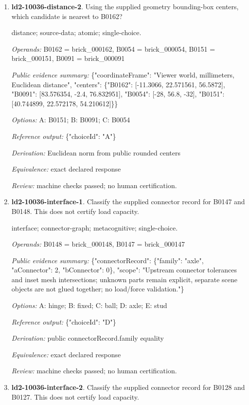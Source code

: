 \begin{enumerate}
\item \textbf{ld2-10036-distance-2}. Using the supplied geometry bounding-box centers, which candidate is nearest to B0162?
\par{\small distance; source-data; atomic; single-choice.\par\textit{Operands:} B0162 = brick\_000162, B0054 = brick\_000054, B0151 = brick\_000151, B0091 = brick\_000091\par\textit{Public evidence summary:} \{"coordinateFrame": "Viewer world, millimeters, Euclidean distance", "centers": \{"B0162": [-11.3066, 22.571561, 56.5872], "B0091": [83.576354, -2.4, 76.832951], "B0054": [-28, 56.8, -32], "B0151": [40.744899, 22.572178, 54.210612]\}\}\par\textit{Options:} A: B0151; B: B0091; C: B0054\par\textit{Reference output:} \{"choiceId": "A"\}\par\textit{Derivation:} Euclidean norm from public rounded centers\par\textit{Equivalence:} exact declared response\par\textit{Review:} machine checks passed; no human certification.}
\item \textbf{ld2-10036-interface-1}. Classify the supplied connector record for B0147 and B0148. This does not certify load capacity.
\par{\small interface; connector-graph; metacognitive; single-choice.\par\textit{Operands:} B0148 = brick\_000148, B0147 = brick\_000147\par\textit{Public evidence summary:} \{"connectorRecord": \{"family": "axle", "aConnector": 2, "bConnector": 0\}, "scope": "Upstream connector tolerances and inset mesh intersections; unknown parts remain explicit, separate scene objects are not glued together; no load/force validation."\}\par\textit{Options:} A: hinge; B: fixed; C: ball; D: axle; E: stud\par\textit{Reference output:} \{"choiceId": "D"\}\par\textit{Derivation:} public connectorRecord.family equality\par\textit{Equivalence:} exact declared response\par\textit{Review:} machine checks passed; no human certification.}
\item \textbf{ld2-10036-interface-2}. Classify the supplied connector record for B0128 and B0127. This does not certify load capacity.

\end{enumerate}

